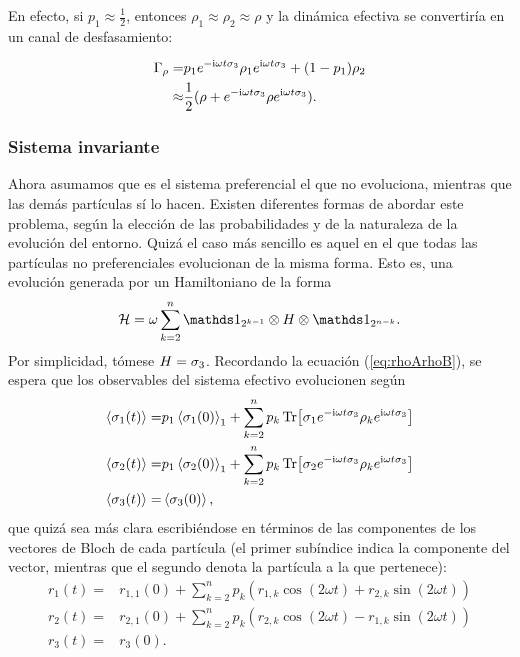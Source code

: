 En efecto, si $p_{1}\approx\frac{1}{2}$, entonces $\rho_{1}\approx\rho_{2}\approx\rho$ y la dinámica efectiva se convertiría en un canal de desfasamiento:

\begin{align*}
    \Gamma_{\rho}=&p_{1}e^{-\text{i}\omega t \sigma_{3}}\rho_{1}e^{\text{i}\omega t \sigma_{3}}+(1-p_{1})\rho_{2}\\
    \approx&\frac{1}{2}(\rho+e^{-\text{i}\omega t \sigma_{3}}\rho e^{\text{i}\omega t \sigma_{3}}).
\end{align*}

\subsubsection{Sistema invariante}

Ahora asumamos que es el sistema preferencial el que no evoluciona, mientras que las demás partículas sí lo hacen. Existen diferentes formas de abordar este problema, según la elección de las probabilidades y de la naturaleza de la evolución del entorno. Quizá el caso más sencillo es aquel en el que todas las partículas no preferenciales evolucionan de la misma forma. Esto es, una evolución generada por un Hamiltoniano de la forma
\begin{equation*}
    \mcH=\omega\sum_{k=2}^{n}\Id_{2^{k-1}}\otimes H \otimes \Id_{2^{n-k}}.
\end{equation*}
Por simplicidad, tómese $H=\sigma_{3}$. Recordando la ecuación (\ref{eq:rhoArhoB}), se espera que los observables del sistema efectivo evolucionen según
\begin{align*}
    \expval{\sigma_{1}(t)}=&p_{1} \expval{\sigma_{1}(0)}_{1}+\sum_{k=2}^{n}p_{k}\Tr[\sigma_{1}e^{-\text{i}\omega t\sigma_{3}} \rho_{k} e^{\text{i}\omega t\sigma_{3}}]\\
    \expval{\sigma_{2}(t)}=&p_{1} \expval{\sigma_{2}(0)}_{1}+\sum_{k=2}^{n}p_{k}\Tr[\sigma_{2}e^{-\text{i}\omega t\sigma_{3}} \rho_{k} e^{\text{i}\omega t\sigma_{3}}]\\
    \expval{\sigma_{3}(t)}=&\expval{\sigma_{3}(0)},
\end{align*}
que quizá sea más clara escribiéndose en términos de las componentes de los vectores de Bloch de cada partícula (el primer subíndice indica la componente del vector, mientras que el segundo denota la partícula a la que pertenece):
\begin{align*}
    r_{1}(t)=&r_{1,1}(0)+\sum_{k=2}^{n}p_{k}(r_{1,k}\cos(2\omega t)+r_{2,k}\sin(2\omega t))\\
    r_{2}(t)=&r_{2,1}(0)+\sum_{k=2}^{n}p_{k}(r_{2,k}\cos(2\omega t)-r_{1,k}\sin(2\omega t))\\
    r_{3}(t)=&r_{3}(0).
\end{align*}
